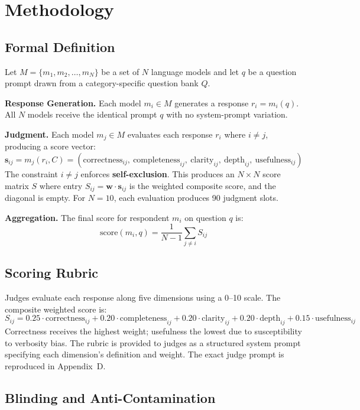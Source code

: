 \documentclass{article}
\begin{document}
\section{Methodology}
\label{sec:methodology}

\subsection{Formal Definition}

Let $M = \{m_1, m_2, \ldots, m_N\}$ be a set of $N$ language models and let $q$ be a question prompt drawn from a category-specific question bank $Q$.

\textbf{Response Generation.} Each model $m_i \in M$ generates a response $r_i = m_i(q)$. All $N$ models receive the identical prompt $q$ with no system-prompt variation.

\textbf{Judgment.} Each model $m_j \in M$ evaluates each response $r_i$ where $i \neq j$, producing a score vector:
\[
\mathbf{s}_{ij} = m_j(r_i, C) = (\text{correctness}_{ij},\ \text{completeness}_{ij},\ \text{clarity}_{ij},\ \text{depth}_{ij},\ \text{usefulness}_{ij})
\]
The constraint $i \neq j$ enforces \textbf{self-exclusion}. This produces an $N \times N$ score matrix $S$ where entry $S_{ij} = \mathbf{w} \cdot \mathbf{s}_{ij}$ is the weighted composite score, and the diagonal is empty. For $N = 10$, each evaluation produces 90 judgment slots.

\textbf{Aggregation.} The final score for respondent $m_i$ on question $q$ is:
\[
\text{score}(m_i, q) = \frac{1}{N-1} \sum_{j \neq i} S_{ij}
\]

\subsection{Scoring Rubric}

Judges evaluate each response along five dimensions using a 0--10 scale. The composite weighted score is:
\[
S_{ij} = 0.25 \cdot \text{correctness}_{ij} + 0.20 \cdot \text{completeness}_{ij} + 0.20 \cdot \text{clarity}_{ij} + 0.20 \cdot \text{depth}_{ij} + 0.15 \cdot \text{usefulness}_{ij}
\]
Correctness receives the highest weight; usefulness the lowest due to susceptibility to verbosity bias. The rubric is provided to judges as a structured system prompt specifying each dimension's definition and weight. The exact judge prompt is reproduced in Appendix~D.

\subsection{Blinding and Anti-Contamination}
\end{document}
